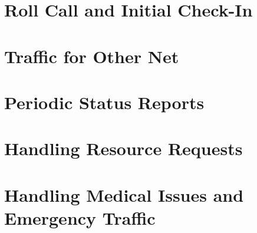 \documentclass[pdflatex,letterpaper,twoside,12pt]{book}
\begin{document}
\section{Roll Call and Initial Check-In}


\section{Traffic for Other Net}


\section{Periodic Status Reports}


\section{Handling Resource Requests}


\section{Handling Medical Issues and Emergency Traffic}

\iffalse %
We want to change emergencies.. No longer will we hold traffic for nets. We need 
to get back to the "Break Break" for emergency traffic, which then we hold only 
for the traffic, not until the ER is rectified. We need to work  HARD on getting 
Medical onto their own freq. and allowing logistics to handle the ER Dispatch, 
etc. We will be having a meeting in January with Leisha and Dave Polaski in 
regards. Wold like you to be there also. More to come here as we get closer, but 
Were taking control and selling the idea direct to Dave to get his buy in and 
push on Dennis. no more Dennis pushing us around. They need to do their job too!
\fi %
\end{document}
